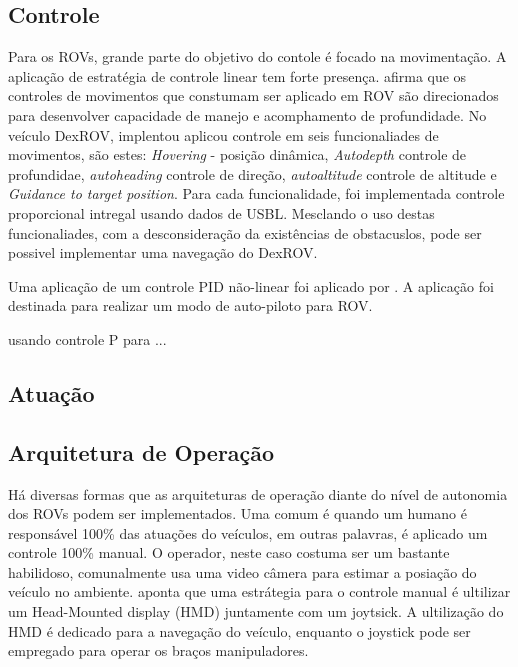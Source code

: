 \subsection{Controle}
Para os ROVs, grande parte do objetivo do contole é focado na movimentação. A aplicação de   estratégia de  controle linear tem forte presença. \cite{Towards} afirma que os controles de movimentos que constumam ser aplicado em ROV são direcionados para desenvolver capacidade de manejo e acomphamento de profundidade. No veículo DexROV, \cite{desgin_joy} implentou aplicou controle em  seis funcionaliades de movimentos, são estes: \textit{Hovering} - posição dinâmica, \textit{Autodepth} controle de profundidae, \textit{autoheading} controle de direção, \textit{autoaltitude} controle de altitude e \textit{Guidance to target position}. Para cada funcionalidade, foi implementada controle proporcional intregal usando dados de USBL. Mesclando o uso destas funcionaliades, com a desconsideração  da existências de obstacuslos, pode ser possivel implementar uma navegação do DexROV.

Uma aplicação de um controle PID não-linear foi aplicado por \cite{wireless_joy}. A aplicação foi destinada para realizar um modo de auto-piloto para ROV.

\cite{visual_serving} usando controle P para ...

\subsection{Atuação}

\subsection{Arquitetura de Operação}
Há diversas formas que as arquiteturas de operação diante do nível de autonomia dos ROVs podem ser implementados. Uma comum é quando um humano é responsável 100\% das atuações do veículos, em outras palavras, é aplicado um controle 100\% manual. O operador, neste caso costuma ser um bastante habilidoso, comunalmente usa uma video câmera para estimar a posiação do veículo no ambiente. \cite{Towards} aponta que uma estrátegia para o controle manual é ultilizar um Head-Mounted display (HMD) juntamente com um joytsick. A ultilização do HMD é dedicado para a navegação do veículo, enquanto o joystick pode ser empregado para operar os braços manipuladores.

